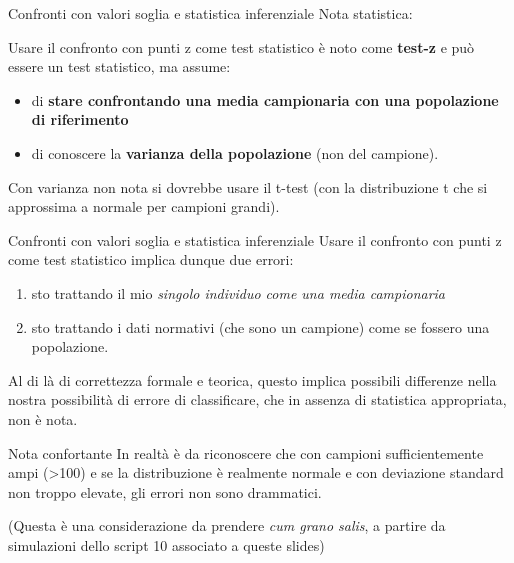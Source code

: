 \documentclass[
  ignorenonframetext,
]{beamer}
\providecommand{\tightlist}{%
  \setlength{\itemsep}{0pt}\setlength{\parskip}{0pt}}
\begin{document}
\begin{frame}{Confronti con valori soglia e statistica inferenziale}
\label{confronti-con-valori-soglia-e-statistica-inferenziale-2}
Nota statistica:

Usare il confronto con punti z come test statistico è noto come
\textbf{test-z} e può essere un test statistico, ma assume:

\begin{itemize}
\tightlist
\item
  di \textbf{stare confrontando una media campionaria con una
  popolazione di riferimento}
\item
  di conoscere la \textbf{varianza della popolazione} (non del
  campione).
\end{itemize}

Con varianza non nota si dovrebbe usare il t-test (con la distribuzione
t che si approssima a normale per campioni grandi).
\end{frame}

\begin{frame}{Confronti con valori soglia e statistica inferenziale}
\label{confronti-con-valori-soglia-e-statistica-inferenziale-3}
Usare il confronto con punti z come test statistico implica dunque due
errori:

\begin{enumerate}
[1)]
\tightlist
\item
  sto trattando il mio \emph{singolo individuo come una media
  campionaria}
\item
  sto trattando i dati normativi (che sono un campione) come se fossero
  una popolazione.
\end{enumerate}

Al di là di correttezza formale e teorica, questo implica possibili
differenze nella nostra possibilità di errore di classificare, che in
assenza di statistica appropriata, non è nota.
\end{frame}

\begin{frame}{Nota confortante}
\label{nota-confortante}
In realtà è da riconoscere che con campioni sufficientemente ampi
(\textgreater100) e se la distribuzione è realmente normale e con
deviazione standard non troppo elevate, gli errori non sono drammatici.

(Questa è una considerazione da prendere \emph{cum grano salis}, a
partire da simulazioni dello script 10 associato a queste slides)
\end{frame}
\end{document}
